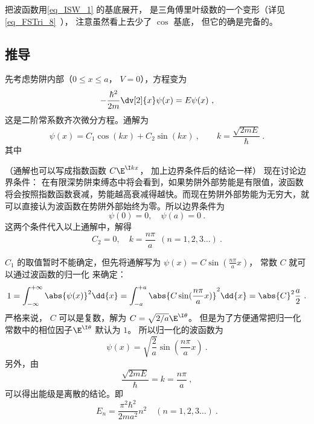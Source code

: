 把波函数用\autoref{eq_ISW_1} 的基底展开， 是三角傅里叶级数的一个变形（详见\autoref{eq_FSTri_8}~）， 注意虽然看上去少了 $\cos$ 基底， 但它的确是完备的。


\subsection{推导} 
先考虑势阱内部（$0 \leqslant x \leqslant a$， $V = 0$），方程变为
\begin{equation}
-\frac{\hbar^2}{2m} \dv[2]{x} \psi(x) = E\psi(x) ~,
\end{equation}
这是二阶常系数齐次微分方程。通解为
\begin{equation}
\psi(x) = C_1\cos(kx) + C_2 \sin(kx)~, \qquad
k = \frac{\sqrt{2mE}}{\hbar}~.
\end{equation} 
其中

（通解也可以写成指数函数 $C\E^{\I kx}$， 加上边界条件后的结论一样）
现在讨论边界条件： 在有限深势阱束缚态中将会看到，如果势阱外部势能是有限值，波函数将会按照指数函数衰减，势能越高衰减得越快。而现在势阱外部势能为无穷大，就可以直接认为波函数在势阱外部始终为零。所以边界条件为
\begin{equation}
\psi(0) = 0, \quad \psi(a) = 0~.
\end{equation}
这两个条件代入以上通解中，解得
\begin{equation}
C_2 = 0, \quad k = \frac{n\pi}{a}  \ \ (n = 1,2,3\dots)~.
\end{equation}

$C_1$ 的取值暂时不能确定，但先将通解写为 $\psi(x) = C\sin(\frac{n\pi }{a}x)$， 常数 $C$ 就可以通过波函数的归一化%
来确定：
\begin{equation}
1 = \int_{-\infty }^{+\infty } \abs{\psi(x)}^2 \dd{x}  = \int_{-a}^{+a} \abs{C\sin(\frac{n\pi }{a} x)}^2 \dd{x}  = \abs{C}^2 \frac{a}{2}~.
\end{equation}
严格来说， $C$ 可以是复数，解为 $C = \sqrt{2/a} \E^{\I\theta}$。 但是为了方便通常把归一化常数中的相位因子$\E^{\I\theta}$ 默认为 $1$。 所以归一化的波函数为
\begin{equation}
\psi(x) = \sqrt{\frac{2}{a}} \sin(\frac{n\pi }{a}x)~.
\end{equation}
另外，由
\begin{equation}
\frac{\sqrt{2mE}}{\hbar} = k = \frac{n\pi }{a}~,
\end{equation}
可以得出能级是离散的结论。即
\begin{equation}
E_n = \frac{\pi^2\hbar^2}{2m a^2} n^2 \quad (n = 1,2,3\dots)~.
\end{equation}
